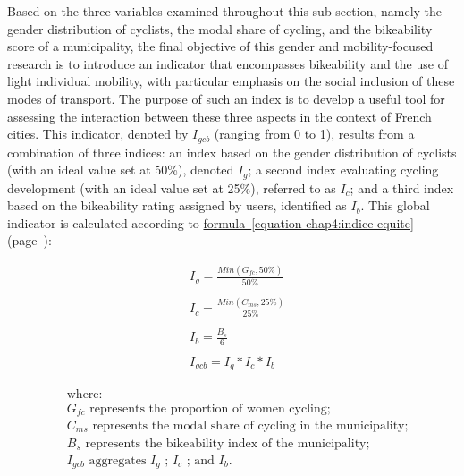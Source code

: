\begin{refsegment}
Based on the three variables examined throughout this sub-section, namely the gender distribution of cyclists, the modal share of cycling, and the bikeability score of a municipality, the final objective of this gender and mobility-focused research is to introduce an indicator that encompasses bikeability and the use of light individual mobility, with particular emphasis on the social inclusion of these modes of transport. The purpose of such an index is to develop a useful tool for assessing the interaction between these three aspects in the context of French cities. This indicator, denoted by \(I_{gcb}\) (ranging from 0 to 1), results from a combination of three indices: an index based on the gender distribution of cyclists (with an ideal value set at 50\%), denoted \(I_{g}\); a second index evaluating cycling development (with an ideal value set at 25\%), referred to as \(I_{c}\); and a third index based on the bikeability rating assigned by users, identified as \(I_{b}\). This global indicator is calculated according to \hyperref[equation-chap4:indice-equite]{formula~\ref{equation-chap4:indice-equite}} (page~\pageref{equation-chap4:indice-equite}):

\begin{equation}
\label{equation-chap4:indice-equite}
\begin{aligned}
&I_{g} = \frac{Min(G_{fc}, 50\%)}{50\%}
    \\\\
&I_{c} = \frac{Min(C_{ms}, 25\%)}{25\%}
    \\\\
&I_{b} = \frac{B_{s}}{6}
    \\\\
&I_{gcb} = I_{g} * I_{c} * I_{b}
\end{aligned}
\end{equation}

\begin{align*}
        &\text{where:} \\
&G_{fc} \text{ represents the proportion of women cycling;} \\
&C_{ms} \text{ represents the modal share of cycling in the municipality;} \\
&B_{s} \text{ represents the bikeability index of the municipality;} \\
&I_{gcb} \text{ aggregates } I_{g} \text{ ; } I_{c} \text{ ; and } I_{b} \text{.}
\end{align*}


\end{refsegment}
